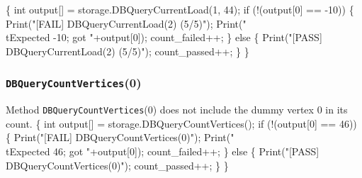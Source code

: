 \documentclass{article}
\def\nwendcode{\endtrivlist \endgroup}
\let\nwdocspar=\par
\begin{document}
\nwenddocs{}\endmoddef{}
\{
  int output[] = storage.DBQueryCurrentLoad(1, 44);
  if (!(output[0] == -10)) \{
    Print("[FAIL] DBQueryCurrentLoad(2) (5/5)");
    Print("\\tExpected -10; got "+output[0]);
    count_failed++;
  \} else \{
    Print("[PASS] DBQueryCurrentLoad(2) (5/5)");
    count_passed++;
  \}
\}
\nwendcode{}\nwdocspar
\subsubsection{{\tt{}DBQueryCountVertices}(0)}
Method {\tt{}DBQueryCountVertices}(0) does not include the dummy vertex 0 in its
count.
\nwenddocs{}\endmoddef{}
\{
  int output[] = storage.DBQueryCountVertices();
  if (!(output[0] == 46)) \{
    Print("[FAIL] DBQueryCountVertices(0)");
    Print("\\tExpected 46; got "+output[0]);
    count_failed++;
  \} else \{
    Print("[PASS] DBQueryCountVertices(0)");
    count_passed++;
  \}
\}
\nwendcode{}\nwdocspar
\end{document}
